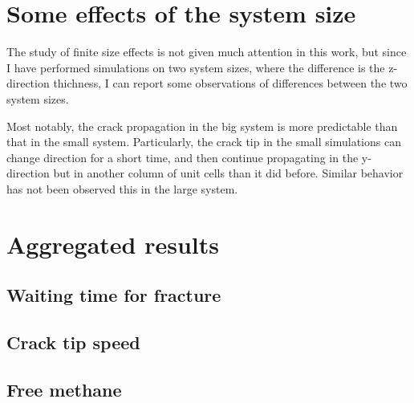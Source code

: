 \section{Some effects of the system size}
The study of finite size effects is not given much attention in this work, but since I have performed simulations on two system sizes, where the difference is the z-direction thichness, I can report some observations of differences between the two system sizes.

Most notably, the crack propagation in the big system is more predictable than that in the small system. Particularly, the crack tip in the small simulations can change direction for a short time, and then continue propagating in the y-direction but in another column of unit cells than it did before. Similar behavior has not been observed this in the large system.

\section{Aggregated results}

\subsection{Waiting time for fracture}

\subsection{Crack tip speed}

\subsection{Free methane}
